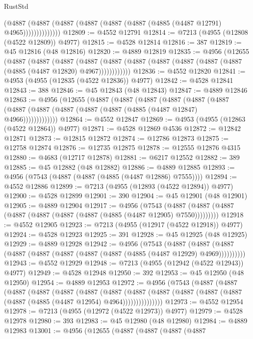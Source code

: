 \begin{lexlean}{RustStd}
\begin{coremodule}
                  (@4887
                    (@4887 (@4887 (@4887 (@4887 (@4887 (@4885 (@4487 @12791) @4965))))))))))))))
@12809 := @4552 @12791
@12814 := @7213 (@4955 (@12808 (@4522 @12809)) @4977)
@12815 := @4528 @12814
@12816 := 387
@12819 := @45 @12816 (@48 @12816)
@12820 := @4889 @12819
@12835 := @4956
    (@12655
      (@4887
        (@4887
          (@4887
            (@4887 (@4887 (@4887 (@4887 (@4887 (@4887 (@4887 (@4885 (@4487 @12820) @4967))))))))))))
@12836 := @4552 @12820
@12841 := @4953 (@4955 (@12835 (@4522 @12836)) @4977)
@12842 := @4528 @12841
@12843 := 388
@12846 := @45 @12843 (@48 @12843)
@12847 := @4889 @12846
@12863 := @4956
    (@12655
      (@4887
        (@4887
          (@4887
            (@4887
              (@4887
                (@4887 (@4887 (@4887 (@4887 (@4887 (@4887 (@4885 (@4487 @12847) @4966)))))))))))))
@12864 := @4552 @12847
@12869 := @4953 (@4955 (@12863 (@4522 @12864)) @4977)
@12871 := @4528 @12869 @4536
@12872 := @12842 @12871
@12873 := @12815 @12872
@12874 := @12786 @12873
@12875 := @12758 @12874
@12876 := @12735 @12875
@12878 := @12555 @12876 @4315
@12880 := @4683 (@12717 @12878)
@12881 := @6217 @12552
@12882 := 389
@12885 := @45 @12882 (@48 @12882)
@12886 := @4889 @12885
@12893 := @4956 (@7543 (@4887 (@4887 (@4885 (@4487 @12886) @7555))))
@12894 := @4552 @12886
@12899 := @7213 (@4955 (@12893 (@4522 @12894)) @4977)
@12900 := @4528 @12899
@12901 := 390
@12904 := @45 @12901 (@48 @12901)
@12905 := @4889 @12904
@12917 := @4956
    (@7543 (@4887 (@4887 (@4887 (@4887 (@4887 (@4887 (@4887 (@4885 (@4487 @12905) @7550)))))))))
@12918 := @4552 @12905
@12923 := @7213 (@4955 (@12917 (@4522 @12918)) @4977)
@12924 := @4528 @12923
@12925 := 391
@12928 := @45 @12925 (@48 @12925)
@12929 := @4889 @12928
@12942 := @4956
    (@7543
      (@4887 (@4887 (@4887 (@4887 (@4887 (@4887 (@4887 (@4887 (@4885 (@4487 @12929) @4969))))))))))
@12943 := @4552 @12929
@12948 := @7213 (@4955 (@12942 (@4522 @12943)) @4977)
@12949 := @4528 @12948
@12950 := 392
@12953 := @45 @12950 (@48 @12950)
@12954 := @4889 @12953
@12972 := @4956
    (@7543
      (@4887
        (@4887
          (@4887
            (@4887
              (@4887
                (@4887
                  (@4887
                    (@4887
                      (@4887 (@4887 (@4887 (@4887 (@4887 (@4885 (@4487 @12954) @4964)))))))))))))))
@12973 := @4552 @12954
@12978 := @7213 (@4955 (@12972 (@4522 @12973)) @4977)
@12979 := @4528 @12978
@12980 := 393
@12983 := @45 @12980 (@48 @12980)
@12984 := @4889 @12983
@13001 := @4956
    (@12655
      (@4887
        (@4887
          (@4887
            (@4887

\end{coremodule}
\end{lexlean}
